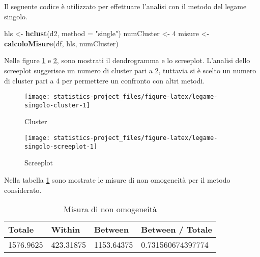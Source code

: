 \documentclass[]{book}
\newenvironment{Shaded}{\begin{snugshade}}{\end{snugshade}}
\newcommand{\KeywordTok}[1]{\textcolor[rgb]{0.13,0.29,0.53}{\textbf{#1}}}
\newcommand{\DataTypeTok}[1]{\textcolor[rgb]{0.13,0.29,0.53}{#1}}
\newcommand{\DecValTok}[1]{\textcolor[rgb]{0.00,0.00,0.81}{#1}}
\newcommand{\StringTok}[1]{\textcolor[rgb]{0.31,0.60,0.02}{#1}}
\newcommand{\NormalTok}[1]{#1}
\begin{document}
Il seguente codice è utilizzato per effettuare l'analisi con il metodo
del legame singolo.

\begin{Shaded}
\begin{Highlighting}[]
\NormalTok{hls <-}\StringTok{ }\KeywordTok{hclust}\NormalTok{(d2, }\DataTypeTok{method =} \StringTok{"single"}\NormalTok{)}
\NormalTok{numCluster <-}\StringTok{ }\DecValTok{4}
\NormalTok{misure <-}\StringTok{ }\KeywordTok{calcoloMisure}\NormalTok{(df, hls, numCluster)}
\end{Highlighting}
\end{Shaded}

Nelle figure \ref{fig:legame-singolo-cluster} e
\ref{fig:legame-singolo-screeplot}, sono mostrati il dendrogramma e lo
screeplot. L'analisi dello screeplot suggerisce un numero di cluster
pari a 2, tuttavia si è scelto un numero di cluster pari a 4 per
permettere un confronto con altri metodi.

\begin{figure}

{\centering \texttt{[image: statistics-project\_files/figure-latex/legame-singolo-cluster-1]} 

}

\caption{Cluster}\label{fig:legame-singolo-cluster}
\end{figure}

\begin{figure}

{\centering \texttt{[image: statistics-project\_files/figure-latex/legame-singolo-screeplot-1]} 

}

\caption{Screeplot}\label{fig:legame-singolo-screeplot}
\end{figure}

Nella tabella \ref{tab:legame-singolo-misure-omogeneita} sono mostrate
le misure di non omogeneità per il metodo considerato.

\begin{table}

\caption{\label{tab:legame-singolo-misure-omogeneita}Misura di non omogeneità}
\centering
\begin{tabular}[t]{l|l|l|l}
\hline
Totale & Within & Between & Between / Totale\\
\hline
1576.9625 & 423.31875 & 1153.64375 & 0.731560674397774\\
\hline
\end{tabular}
\end{table}
\end{document}
